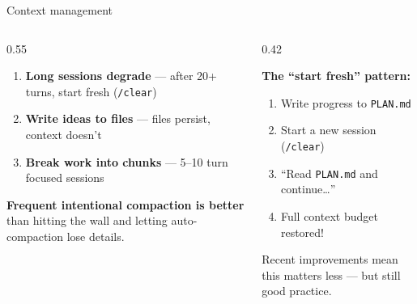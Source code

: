 \documentclass[aspectratio=169, 10pt]{beamer}
\begin{document}
\begin{frame}{Context management}
\begin{columns}[T]
\begin{column}{0.55\textwidth}
\vskip2pt
\begin{enumerate}\setlength{\itemsep}{6pt}
  \item[\color{SlateTeal}\textbf{1.}] \textbf{Long sessions degrade} --- after 20+ turns, start fresh (\texttt{/clear})
  \pause
  \item[\color{SlateTeal}\textbf{2.}] \textbf{Write ideas to files} --- files persist, context doesn't
  \pause
  \item[\color{SlateTeal}\textbf{3.}] \textbf{Break work into chunks} --- 5--10 turn focused sessions
\end{enumerate}
\vskip8pt
\begin{tcolorbox}[quotebox]
\small \textbf{Frequent intentional compaction is better} than hitting the wall and letting auto-compaction lose details.
\end{tcolorbox}
\end{column}
\begin{column}{0.42\textwidth}
\vskip2pt
\begin{tcolorbox}[accentbox]
\small
\textbf{The ``start fresh'' pattern:}
\vskip2pt
\begin{enumerate}\setlength{\itemsep}{0pt}\small
  \item Write progress to \texttt{PLAN.md}
  \item Start a new session (\texttt{/clear})
  \item ``Read \texttt{PLAN.md} and continue\ldots''
  \item Full context budget restored!
\end{enumerate}
\end{tcolorbox}
\vskip4pt
{\scriptsize\color{CoolGray} Recent improvements mean this matters less --- but still good practice.}
\end{column}
\end{columns}\end{frame}
\end{document}
